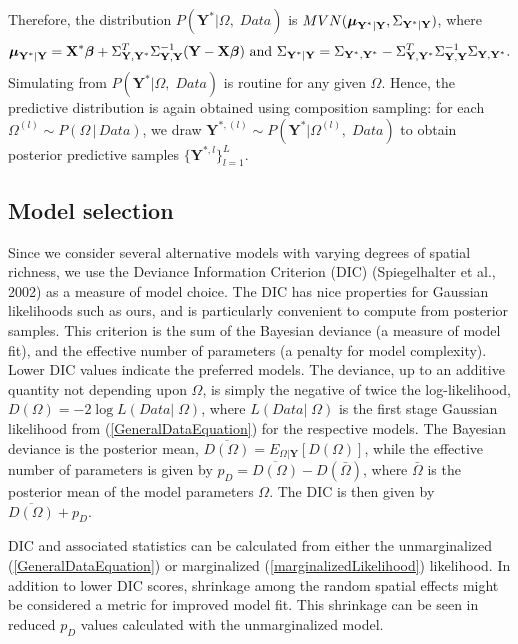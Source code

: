 \documentclass[a4paper]{article}
\newcommand{\bbeta}{ \mbox{\boldmath $ \beta $} }
\newcommand{\bmu}{ \mbox{\boldmath $\mu$} }
\newcommand{\bX}{\textbf{X}}
\newcommand{\bY}{\textbf{Y}}
\begin{document}
Therefore, the distribution $P(\bY^{\ast} | \Omega,\; Data)$ is
$MVN(\bmu_{\bY^{\ast}|\bY},\Sigma_{\bY^{\ast}|\bY})$, where
\begin{equation*}
\bmu_{\bY^{\ast}|\bY} = \bX^{\ast}\bbeta +
\Sigma_{\bY,\bY^{\ast}}^{T}\Sigma_{\bY,\bY}^{-1}(\bY - \bX\bbeta) \text{ and }
\Sigma_{\bY^{\ast}|\bY} = \Sigma_{\bY^{\ast},\bY^{\ast}} -
\Sigma_{\bY,\bY^{\ast}}^{T}\Sigma_{\bY,\bY}^{-1}\Sigma_{\bY,\bY^{\ast}}.
\end{equation*}
Simulating from $P(\bY^{\ast} | \Omega,\; Data)$ is routine for any
given $\Omega$. Hence, the predictive distribution is again obtained
using composition sampling: for each $\Omega^{(l)} \sim
P(\Omega\,|\, Data)$, we draw $\bY^{\ast,(l)}\sim P(\bY^{\ast} |
\Omega^{(l)},\; Data)$ to obtain posterior predictive samples
$\{\bY^{\ast,l}\}_{l=1}^{L}$.

\subsection{Model selection}\label{modFit}

Since we consider several alternative models with varying degrees of
spatial richness, we use the Deviance Information Criterion (DIC)
(Spiegelhalter et al., 2002) as a measure of model choice. The DIC has nice
properties for Gaussian likelihoods such as ours, and is particularly
convenient to compute from posterior samples. This criterion is the
sum of the Bayesian deviance (a measure of model fit), and the
effective number of parameters (a penalty for model complexity).
Lower DIC values indicate the preferred models. The deviance, up to
an additive quantity not depending upon $\Omega$, is simply the
negative of twice the log-likelihood, $D(\Omega) = -2\log L(Data
|\;\Omega)$, where $L(Data |\;\Omega)$ is the first stage Gaussian
likelihood from (\ref{GeneralDataEquation}) for the respective
models. The Bayesian deviance is the posterior mean,
$\overline{D(\Omega)}=E_{\Omega |\bY}[D(\Omega)]$, while the
effective number of parameters is given by
$p_{D}=\overline{D(\Omega)}-D(\bar{\Omega})$, where $\bar{\Omega}$ is the posterior mean of the model parameters $\Omega$. The DIC is then given
by $\overline{D(\Omega)}+p_{D}$.

DIC and associated statistics can be calculated from either the unmarginalized (\ref{GeneralDataEquation}) or marginalized (\ref{marginalizedLikelihood})
likelihood.  In addition to lower DIC scores, shrinkage among the random spatial effects might be considered a metric for improved model fit.  This shrinkage can be seen in reduced $p_{D}$ values calculated with the unmarginalized model. 
\end{document}
